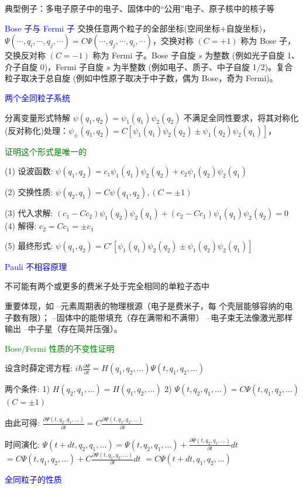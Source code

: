 \documentclass[a4paper,8pt]{extarticle} %
\newcommand{\bluetext}[1]{\textcolor{blue}{#1}}
\newcommand{\greentext}[1]{\textcolor{green}{#1}}
\begin{document}
\begin{multicols}{3}
典型例子：多电子原子中的电子、固体中的“公用”电子、原子核中的核子等

\bluetext{Bose 子与 Fermi 子}
交换任意两个粒子的全部坐标(空间坐标+自旋坐标)，$\Psi(\cdots,q_i,\cdots,q_j,\cdots)=C\Psi(\cdots,q_j,\cdots,q_i,\cdots)$，交换对称 $(C=+1)$ 称为 Bose 子，交换反对称 $(C=-1)$ 称为 Fermi 子。Bose 子自旋 $s$ 为整数 (例如光子自旋 1、介子自旋 0)，Fermi 子自旋 $s$ 为半整数 (例如电子、质子、中子自旋 1/2)。复合粒子取决于总自旋 (例如中性原子取决于中子数，偶为 Bose，奇为 Fermi)。

\bluetext{两个全同粒子系统}

分离变量形式特解 $\psi(q_1,q_2) = \psi_1(q_1)\psi_2(q_2)$ 不满足全同性要求，将其对称化(反对称化)处理：$\psi_{\pm}(q_1,q_2) = C[\psi_1(q_1)\psi_2(q_2) \pm \psi_1(q_2)\psi_2(q_1)]$，

\greentext{证明这个形式是唯一的}

(1) 设波函数:
$\psi(q_1,q_2) = c_1\psi_1(q_1)\psi_2(q_2) + c_2\psi_1(q_2)\psi_2(q_1)$

(2) 交换性质:
$\psi(q_2,q_1) = C\psi(q_1,q_2), (C = \pm1)$

(3) 代入求解:
$(c_1 - Cc_2)\psi_1(q_2)\psi_2(q_1) + (c_2 - Cc_1)\psi_1(q_1)\psi_2(q_2) = 0$
(4) 解得:
$c_2 = Cc_1 = \pm c_1$

(5) 最终形式:
$\psi(q_1,q_2) = C'[\psi_1(q_1)\psi_2(q_2) \pm \psi_1(q_2)\psi_2(q_1)]$

\bluetext{Pauli 不相容原理}

不可能有两个或更多的费米子处于完全相同的单粒子态中

重要体现，如
–元素周期表的物理根源（电子是费米子，每
个壳层能够容纳的电子数有限）；
–固体中的能带填充（存在满带和不满带）
–电子束无法像激光那样输出
–中子星（存在简并压强）。

\greentext{Bose/Fermi 性质的不变性证明}

设含时薛定谔方程:
$i\hbar\frac{\partial\Psi}{\partial t} = H(q_1,q_2,...)\Psi(t,q_1,q_2,...)$

两个条件:
1) $H(q_2,q_1,...) = H(q_1,q_2,...)$
2) $\Psi(t,q_2,q_1,...) = C\Psi(t,q_1,q_2,...)$ $(C = \pm1)$

由此可得:
$\frac{\partial\Psi(t,q_2,q_1,...)}{\partial t} = C\frac{\partial\Psi(t,q_1,q_2,...)}{\partial t}$

时间演化:
$\Psi(t+dt,q_2,q_1,...) = \Psi(t,q_2,q_1,...) + \frac{\partial\Psi(t,q_2,q_1,...)}{\partial t}dt$
$= C\Psi(t,q_1,q_2,...) + C\frac{\partial\Psi(t,q_1,q_2,...)}{\partial t}dt$
$= C\Psi(t+dt,q_1,q_2,...)$

\bluetext{全同粒子的性质}


\end{multicols}
\end{document}
